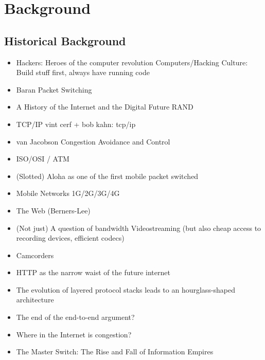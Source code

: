 \chapter{Background}
\label{chap:relatedwork}



\section{Historical Background}

\begin{itemize}
\item Hackers: Heroes of the computer revolution \cite{levy2010hackers}
		Computers/Hacking Culture: Build stuff first, always have running code
\item Baran Packet Switching
\item A History of the Internet and the Digital Future \cite{ryan2010history}
		RAND
\item TCP/IP vint cerf + bob kahn: tcp/ip \cite{1092259}
\item van Jacobson Congestion Avoidance and Control \cite{jacobson1988congestion}
\item ISO/OSI / ATM
\item (Slotted) Aloha as one of the first mobile packet switched
\item Mobile Networks 1G/2G/3G/4G
\item The Web (Berners-Lee)
\item (Not just) A question of bandwidth Videostreaming (but also cheap access to recording devices, efficient codecs)
\item Camcorders

\item HTTP as the narrow waist of the future internet \cite{Popa:2010:HNW:1868447.1868453}
\item The evolution of layered protocol stacks leads to an hourglass-shaped architecture \cite{akhshabi2011evolution}
\item The end of the end-to-end argument? \cite{reed2000endofe2e}
\item Where in the Internet is congestion? \cite{genin2013internet}
\item The Master Switch: The Rise and Fall of Information Empires \cite{wu2010master}


\end{itemize}

